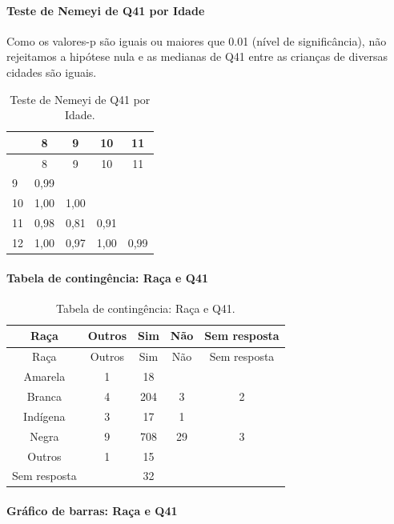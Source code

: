 \documentclass[]{article}
\let\oldparagraph\paragraph
\renewcommand{\paragraph}[1]{\oldparagraph{#1}\mbox{}}
\begin{document}
\hypertarget{teste-de-nemeyi-de-q41-por-idade}{%
\paragraph{Teste de Nemeyi de Q41 por Idade}\label{teste-de-nemeyi-de-q41-por-idade}}

Como os valores-p são iguais ou maiores que 0.01 (nível de significância), não rejeitamos a hipótese nula e as medianas de Q41 entre as crianças de diversas cidades são iguais.

\begin{longtable}[]{@{}lcccc@{}}
\caption{\label{tab:unnamed-chunk-1634}Teste de Nemeyi de Q41 por Idade.}\tabularnewline
\toprule
& 8 & 9 & 10 & 11\tabularnewline
\midrule
\endfirsthead
\toprule
& 8 & 9 & 10 & 11\tabularnewline
\midrule
\endhead
9 & 0,99 & & &\tabularnewline
10 & 1,00 & 1,00 & &\tabularnewline
11 & 0,98 & 0,81 & 0,91 &\tabularnewline
12 & 1,00 & 0,97 & 1,00 & 0,99\tabularnewline
\bottomrule
\end{longtable}

\cleardoublepage

\hypertarget{tabela-de-continguxeancia-rauxe7a-e-q41}{%
\paragraph{Tabela de contingência: Raça e Q41}\label{tabela-de-continguxeancia-rauxe7a-e-q41}}

\begin{longtable}[]{@{}ccccc@{}}
\caption{\label{tab:unnamed-chunk-1635}Tabela de contingência: Raça e Q41.}\tabularnewline
\toprule
Raça & Outros & Sim & Não & Sem resposta\tabularnewline
\midrule
\endfirsthead
\toprule
Raça & Outros & Sim & Não & Sem resposta\tabularnewline
\midrule
\endhead
Amarela & 1 & 18 & &\tabularnewline
Branca & 4 & 204 & 3 & 2\tabularnewline
Indígena & 3 & 17 & 1 &\tabularnewline
Negra & 9 & 708 & 29 & 3\tabularnewline
Outros & 1 & 15 & &\tabularnewline
Sem resposta & & 32 & &\tabularnewline
\bottomrule
\end{longtable}

\hypertarget{gruxe1fico-de-barras-rauxe7a-e-q41}{%
\paragraph{Gráfico de barras: Raça e Q41}\label{gruxe1fico-de-barras-rauxe7a-e-q41}}
\end{document}
